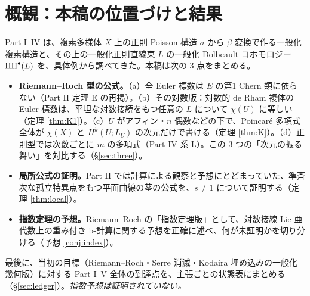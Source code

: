 \section{概観：本稿の位置づけと結果}
Part I--IV は、複素多様体 $X$ 上の正則 Poisson 構造 $\sigma$ から $\beta$-変換で作る一般化複素構造と、その上の一般化正則直線束 $L$ の一般化 Dolbeault コホモロジー $\mathrm{HH}^\bullet(L)$ を、具体例から調べてきた。本稿は次の 3 点をまとめる。

\begin{itemize}
\item \textbf{Riemann--Roch 型の公式。}（a）全 Euler 標数は $E$ の第1 Chern 類に依らない（Part II 定理 E の再掲）。（b）その対数版：対数的 de Rham 複体の Euler 標数は、平坦な対数接続をもつ任意の $L$ について $\chi(U)$ に等しい（定理 \ref{thm:K1}）\tP。（c）$U$ がアフィン・$n$ 偶数などの下で、Poincaré 多項式全体が $\chi(X)$ と $H^k(U;L_U)$ の次元だけで書ける（定理 \ref{thm:K}）\tP\tV。（d）正則型では次数ごとに $m$ の多項式（Part IV 系 L）。この 3 つの「次元の振る舞い」を対比する（\S\ref{sec:three}）。
\item \textbf{局所公式の証明。}Part II では計算による観察と予想にとどまっていた、準斉次な孤立特異点をもつ平面曲線の茎の公式を、$s\ne1$ について証明する（定理 \ref{thm:local}）\tP。
\item \textbf{指数定理の予想。}Riemann--Roch の「指数定理版」として、対数接線 Lie 亜代数上の重み付き b-計算に関する予想を正確に述べ、何が未証明かを切り分ける（予想 \ref{conj:index}）\tK。
\end{itemize}
最後に、当初の目標（Riemann--Roch・Serre 消滅・Kodaira 埋め込みの一般化幾何版）に対する Part I--V 全体の到達点を、主張ごとの状態表にまとめる（\S\ref{sec:ledger}）。\emph{指数予想は証明されていない。}

